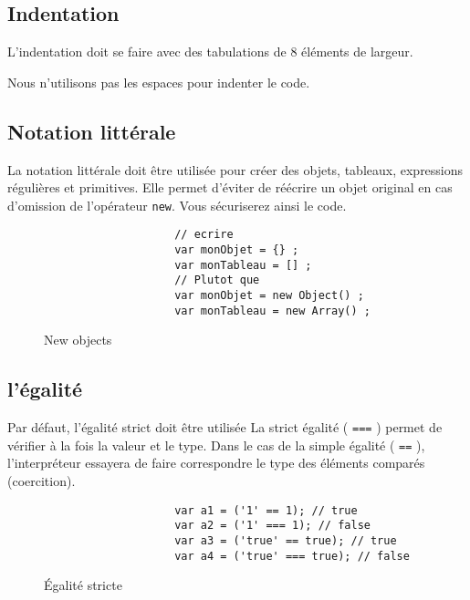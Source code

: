 		\subsection{Indentation}
			L'indentation doit se faire avec des tabulations de 8 éléments de largeur.

			Nous n'utilisons pas les espaces pour indenter le code.

		\subsection{Notation littérale}
			La notation littérale doit être utilisée pour créer des objets, tableaux, expressions régulières et primitives. Elle permet d'éviter de réécrire un objet original en cas d'omission de l'opérateur \verb+new+. Vous sécuriserez ainsi le code.

			\begin{figure}[H]
				\begin{changemargin}{-2.5cm}{-2.5cm}
				\begin{tcolorbox}
				\begin{verbatim}
					// ecrire
					var monObjet = {} ;
					var monTableau = [] ;
					// Plutot que
					var monObjet = new Object() ;
					var monTableau = new Array() ;
				\end{verbatim}
				\end{tcolorbox}
				\end{changemargin}
				\caption{New objects}
			\end{figure}

		\subsection{l'égalité}
			Par défaut, l'égalité strict doit être utilisée La strict égalité ( \verb+===+ ) permet de vérifier à la fois la valeur et le type. Dans le cas de la simple égalité ( \verb+==+ ), l'interpréteur essayera de faire correspondre le type des éléments comparés (coercition).

			\begin{figure}[H]
				\begin{changemargin}{-2.5cm}{-2.5cm}
				\begin{tcolorbox}
				\begin{verbatim}
					var a1 = ('1' == 1); // true
					var a2 = ('1' === 1); // false
					var a3 = ('true' == true); // true
					var a4 = ('true' === true); // false
				\end{verbatim}
				\end{tcolorbox}
				\end{changemargin}
				\caption{\'Egalité stricte}
			\end{figure}

